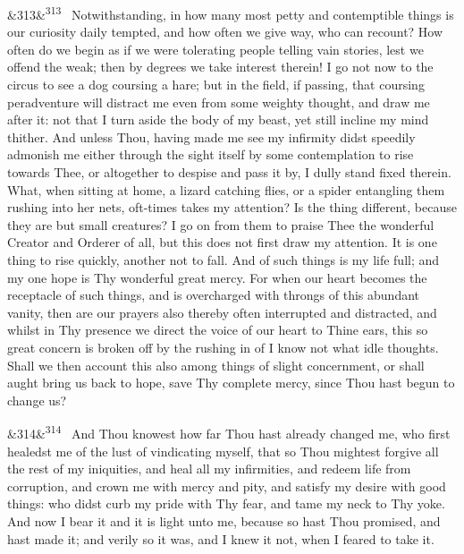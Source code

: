 \documentclass[12pt]{article}
\newcommand{\para}[1][]{\par\noindent\ifx&#1&\else\textsuperscript{\footnotesize #1}~\fi}
\begin{document}
\para[313] Notwithstanding, in how many most petty and contemptible things is our curiosity daily tempted, and how often we give way, who can recount? How often do we begin as if we were tolerating people telling vain stories, lest we offend the weak; then by degrees we take interest therein! I go not now to the circus to see a dog coursing a hare; but in the field, if passing, that coursing peradventure will distract me even from some weighty thought, and draw me after it: not that I turn aside the body of my beast, yet still incline my mind thither. And unless Thou, having made me see my infirmity didst speedily admonish me either through the sight itself by some contemplation to rise towards Thee, or altogether to despise and pass it by, I dully stand fixed therein. What, when sitting at home, a lizard catching flies, or a spider entangling them rushing into her nets, oft-times takes my attention? Is the thing different, because they are but small creatures? I go on from them to praise Thee the wonderful Creator and Orderer of all, but this does not first draw my attention. It is one thing to rise quickly, another not to fall. And of such things is my life full; and my one hope is Thy wonderful great mercy. For when our heart becomes the receptacle of such things, and is overcharged with throngs of this abundant vanity, then are our prayers also thereby often interrupted and distracted, and whilst in Thy presence we direct the voice of our heart to Thine ears, this so great concern is broken off by the rushing in of I know not what idle thoughts. Shall we then account this also among things of slight concernment, or shall aught bring us back to hope, save Thy complete mercy, since Thou hast begun to change us?

\para[314] And Thou knowest how far Thou hast already changed me, who first healedst me of the lust of vindicating myself, that so Thou mightest forgive all the rest of my iniquities, and heal all my infirmities, and redeem life from corruption, and crown me with mercy and pity, and satisfy my desire with good things: who didst curb my pride with Thy fear, and tame my neck to Thy yoke. And now I bear it and it is light unto me, because so hast Thou promised, and hast made it; and verily so it was, and I knew it not, when I feared to take it.
\end{document}
